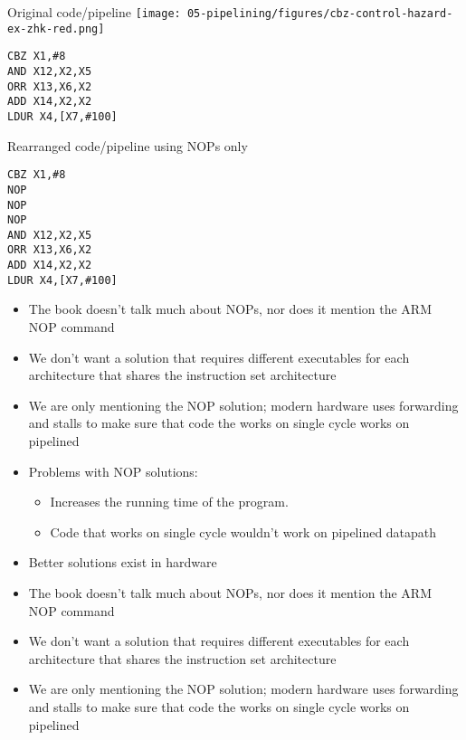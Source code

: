 \begin{frame}[fragile]
{\tiny
\begin{multicols}{2}
Original code/pipeline
\texttt{[image: 05-pipelining/figures/cbz-control-hazard-ex-zhk-red.png]}
\begin{verbatim}
CBZ X1,#8            
AND X12,X2,X5          
ORR X13,X6,X2           
ADD X14,X2,X2           
LDUR X4,[X7,#100]      
\end{verbatim}
    \columnbreak
    Rearranged code/pipeline using NOPs only
\begin{verbatim}
CBZ X1,#8     
NOP
NOP
NOP
AND X12,X2,X5          
ORR X13,X6,X2           
ADD X14,X2,X2           
LDUR X4,[X7,#100] 
\end{verbatim}
\end{multicols}}

\BNotes\ifnum{}
\begin{itemize}
\item The book doesn't talk much about NOPs, nor does it mention the ARM NOP command
\item We don't want a solution that requires different executables for each
  architecture that shares the instruction set architecture
\item We are only mentioning the NOP solution; modern hardware uses forwarding and stalls to make sure that code the works on single cycle works on pipelined
\end{itemize}
\fi\ENotes
\end{frame}


\begin{frame}[fragile]
\begin{itemize}
\item Problems with NOP solutions:
  \begin{itemize}
  \item Increases the running time of the program.
  \item Code that works on single cycle wouldn't work on pipelined datapath
  \end{itemize}
\item Better solutions exist in hardware
\end{itemize}
\BNotes\ifnum{}
\begin{itemize}
\item The book doesn't talk much about NOPs, nor does it mention the ARM NOP command
\item We don't want a solution that requires different executables for each
  architecture that shares the instruction set architecture
\item We are only mentioning the NOP solution; modern hardware uses forwarding and stalls to make sure that code the works on single cycle works on pipelined
\end{itemize}
\fi\ENotes
\end{frame}





